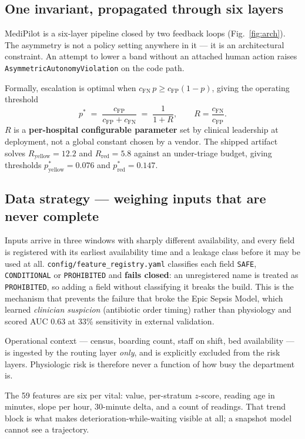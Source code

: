 \documentclass[10pt,a4paper,twocolumn]{article}
\newcommand{\pth}[1]{\textcolor{SecPurple}{\texttt{#1}}}
\newcommand{\cm}[1]{\texttt{#1}}
\begin{document}
\subsection{One invariant, propagated through six layers}
MediPilot is a six-layer pipeline closed by two feedback loops (Fig.~\ref{fig:arch}). The
asymmetry is not a policy setting anywhere in it --- it is an architectural constraint. An attempt
to lower a band without an attached human action raises
\cm{AsymmetricAutonomyViolation} on the code path.

Formally, escalation is optimal when $c_{\text{FN}}\,p \ge c_{\text{FP}}(1-p)$, giving the
operating threshold
\[
p^{*} \;=\; \frac{c_{\text{FP}}}{c_{\text{FP}}+c_{\text{FN}}} \;=\; \frac{1}{1+R},
\qquad R = \frac{c_{\text{FN}}}{c_{\text{FP}}}.
\]
$R$ is a \textbf{per-hospital configurable parameter} set by clinical leadership at deployment, not
a global constant chosen by a vendor. The shipped artifact solves $R_{\text{yellow}}=12.2$ and
$R_{\text{red}}=5.8$ against an under-triage budget, giving thresholds $p^{*}_{\text{yellow}}=0.076$
and $p^{*}_{\text{red}}=0.147$.

\subsection{Data strategy --- weighing inputs that are never complete}
Inputs arrive in three windows with sharply different availability, and every field is registered
with its earliest availability time and a leakage class before it may be used at all.
\pth{config/feature\_registry.yaml} classifies each field \cm{SAFE}, \cm{CONDITIONAL} or
\cm{PROHIBITED} and \textbf{fails closed}: an unregistered name is treated as \cm{PROHIBITED}, so
adding a field without classifying it breaks the build. This is the mechanism that prevents the
failure that broke the Epic Sepsis Model, which learned \emph{clinician suspicion} (antibiotic
order timing) rather than physiology and scored AUC 0.63 at 33\% sensitivity in external
validation.

Operational context --- census, boarding count, staff on shift, bed availability --- is ingested by
the routing layer \emph{only}, and is explicitly excluded from the risk layers. Physiologic risk is
therefore never a function of how busy the department is.

The 59 features are six per vital: value, per-stratum $z$-score, reading age in minutes, slope per
hour, 30-minute delta, and a count of readings. That trend block is what makes
deterioration-while-waiting visible at all; a snapshot model cannot see a trajectory.
\end{document}
